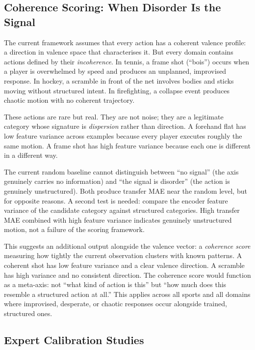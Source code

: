 \documentclass[11pt]{article}
\begin{document}
\subsection{Coherence Scoring: When Disorder Is the Signal}

The current framework assumes that every action has a coherent valence profile: a direction in valence space that characterises it. But every domain contains actions defined by their \emph{incoherence}. In tennis, a frame shot (``bois'') occurs when a player is overwhelmed by speed and produces an unplanned, improvised response. In hockey, a scramble in front of the net involves bodies and sticks moving without structured intent. In firefighting, a collapse event produces chaotic motion with no coherent trajectory.

These actions are rare but real. They are not noise; they are a legitimate category whose signature is \emph{dispersion} rather than direction. A forehand flat has low feature variance across examples because every player executes roughly the same motion. A frame shot has high feature variance because each one is different in a different way.

The current random baseline cannot distinguish between ``no signal'' (the axis genuinely carries no information) and ``the signal is disorder'' (the action is genuinely unstructured). Both produce transfer MAE near the random level, but for opposite reasons. A second test is needed: compare the encoder feature variance of the candidate category against structured categories. High transfer MAE combined with high feature variance indicates genuinely unstructured motion, not a failure of the scoring framework.

This suggests an additional output alongside the valence vector: a \emph{coherence score} measuring how tightly the current observation clusters with known patterns. A coherent shot has low feature variance and a clear valence direction. A scramble has high variance and no consistent direction. The coherence score would function as a meta-axis: not ``what kind of action is this'' but ``how much does this resemble a structured action at all.'' This applies across all sports and all domains where improvised, desperate, or chaotic responses occur alongside trained, structured ones.

\subsection{Expert Calibration Studies}
\end{document}
